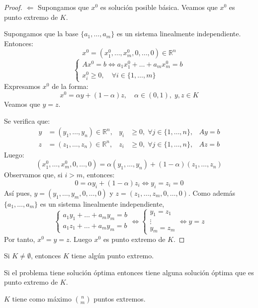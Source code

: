 \begin{proof}
    $\boxed{\Leftarrow}$ Supongamos que $x^0$ es solución posible básica.
    Veamos que $x^0$ es punto extremo de $K$.

    Supongamos que la base $\{a_1, \dots, a_m\}$ es un sistema linealmente independiente.
    Entonces:
    $$x^0 = (x^0_1, \dots, x^0_m, 0, \dots, 0) \in \mathbb{R}^n$$
    $$\begin{cases}
            Ax^0 = b \Leftrightarrow a_1x^0_1 + \dots + a_mx^0_m = b \\
            x^0_i \geq 0, \quad \forall i \in \{1, \dots, m\}
        \end{cases}$$
    Expresamos $x^0$ de la forma:
    $$x^0 = \alpha y + (1-\alpha)z, \quad \alpha \in (0, 1), \; y, z \in K$$
    Veamos que $y = z$.

    Se verifica que:
    \begin{align*}
        y & = (y_1, \dots, y_n) \in \mathbb{R}^n, & y_i & \geq 0, \; \forall j \in \{1, \dots, n\}, & Ay = b \\
        z & = (z_1, \dots, z_n) \in \mathbb{R}^n, & z_i & \geq 0, \; \forall j \in \{1, \dots, n\}, & Az = b
    \end{align*}
    Luego:
    $$(x^0_1, \dots, x^0_m, 0, \dots, 0) = \alpha(y_1, \dots, y_n) + (1-\alpha)(z_1, \dots, z_n)$$
    Observamos que, si $i > m$, entonces:
    $$0 = \alpha y_i + (1-\alpha)z_i \Leftrightarrow y_i = z_i = 0$$
    Así pues, $y = (y_1, \dots, y_m, 0, \dots, 0)$ y $z = (z_1, \dots, z_m, 0, \dots, 0)$.
    Como además $\{a_1, \dots, a_m\}$ es un sistema linealmente independiente,
    $$\begin{cases}
            a_1y_1 + \dots + a_my_m = b \\
            a_1z_1 + \dots + a_my_m = b
        \end{cases} \Leftrightarrow
        \begin{cases}
            y_1 = z_1 \\
            \vdots    \\
            y_m = z_m
        \end{cases} \Leftrightarrow y = z$$
    Por tanto, $x^0 = y = z$.
    Luego $x^0$ es punto extremo de $K$.
\end{proof}

\begin{corollary}
    Si $K \neq \emptyset$, entonces $K$ tiene algún punto extremo.
\end{corollary}

\begin{corollary}
    Si el problema tiene solución óptima entonces tiene alguna solución óptima que es punto extremo de $K$.
\end{corollary}

\begin{corollary}
    $K$ tiene como máximo $\binom{n}{m}$ puntos extremos.
\end{corollary}